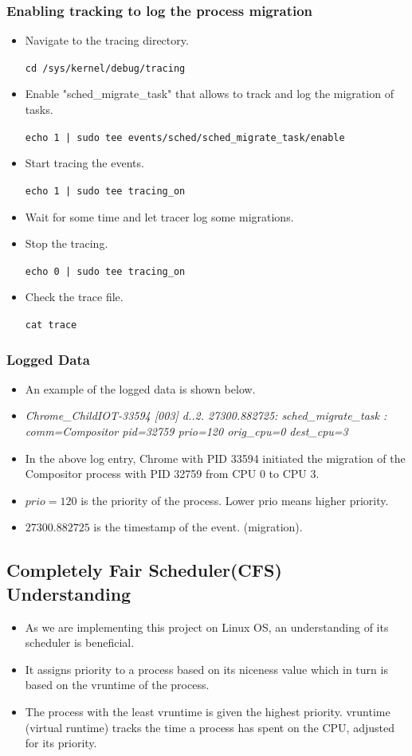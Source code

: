 \documentclass[12pt]{article}
\begin{document}
\subsubsection{Enabling tracking to log the process migration}
\begin{itemize}
    \item Navigate to the tracing directory. 
    
    \texttt{cd /sys/kernel/debug/tracing}
    \item Enable "sched\_migrate\_task" that allows to track and log the migration of tasks.

    \texttt{echo 1 | sudo tee events/sched/sched_migrate_task/enable}
    \item Start tracing the events. 
    
    \texttt{echo 1 | sudo tee tracing_on}
    \item Wait for some time and let tracer log some migrations.
    \item Stop the tracing. 
    
    \texttt{echo 0 | sudo tee tracing_on}
    \item Check the trace file. 
    
    \texttt{cat trace}
\end{itemize}
\subsubsection{Logged Data}
\begin{itemize}
    \item An example of the logged data is shown below.
    \item \textit{Chrome\_ChildIOT-33594   [003] d..2. 27300.882725: sched\_migrate\_task : comm=Compositor pid=32759 prio=120 orig\_cpu=0 dest\_cpu=3}
    \item In the above log entry, Chrome with PID 33594 initiated the migration of the Compositor process with PID 32759 from CPU 0 to CPU 3.
    \item $prio =120$ is the priority of the process. Lower prio means higher priority.
    \item $27300.882725$ is the timestamp of the event. (migration).
\end{itemize}
\subsection{Completely Fair Scheduler(CFS) Understanding}
\begin{itemize}
    \item As we are implementing this project on Linux OS, an understanding of its scheduler is beneficial.
    \item It assigns priority to a process based on its niceness value which in turn is based on the vruntime of the process.
    \item The process with the least vruntime is given the highest priority. vruntime (virtual runtime) tracks the time a process has spent on the CPU, adjusted for its priority.
\end{itemize}
\end{document}
